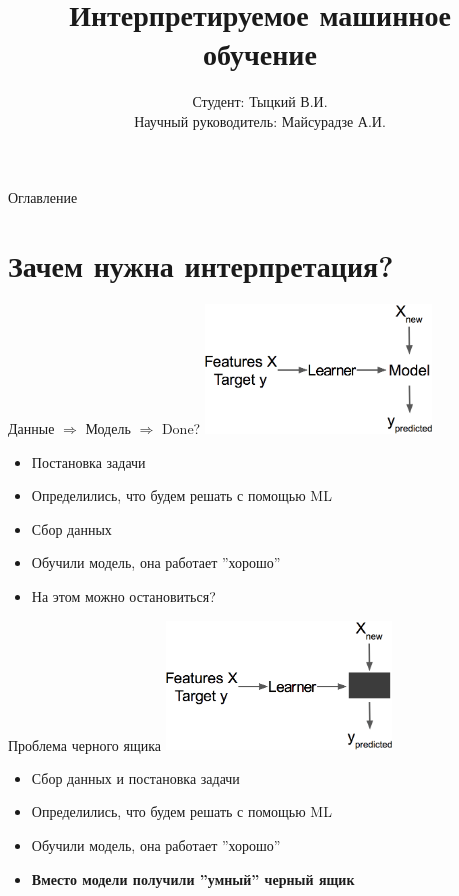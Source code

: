 \documentclass[fleqn, xcolor=x11names]{beamer}
\title{\bfseries Интерпретируемое машинное обучение}
\author[Тыцкий В.И.]{Студент: Тыцкий В.И. \\[1ex]  {\small Научный руководитель: Майсурадзе А.И.}}
\institute[ВМК МГУ]{МГУ имени М. В. Ломоносова, факультет ВМК, кафедра ММП}
\date{}
\begin{document}
\begin{frame}
    \titlepage
\end{frame}

\begin{frame}{Оглавление}
     \tableofcontents
\end{frame}


\section{Зачем нужна интерпретация?}

\begin{frame}{Данные $\Rightarrow$ Модель $\Rightarrow$ Done?}
    \centering
    \includegraphics[width=6cm]{explain_pipline_0.png}

    \begin{itemize}
        \item  Постановка задачи 
        \item Определились, что будем решать с помощью ML
        \item Сбор данных
        \item Обучили модель, она работает ''хорошо''
        \item На этом можно остановиться?
    \end{itemize}
    
\end{frame}

\begin{frame}{Проблема черного ящика}
    \centering
    \includegraphics[width=6cm]{explain_pipline_1.png}

    \begin{itemize}
        \item Сбор данных и постановка задачи 
        \item Определились, что будем решать с помощью ML
        \item Обучили модель, она работает ''хорошо''
        \item \textbf{Вместо модели получили ''умный'' черный ящик}
    \end{itemize}
    
\end{frame}
\end{document}
